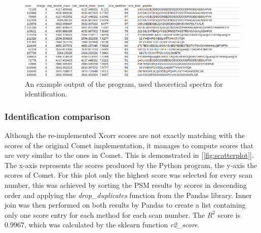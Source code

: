 \documentclass[11pt]{article}
\begin{document}
\begin{figure}[ht]
\centering
\includegraphics[width=1\textwidth]{figs/output.png}
\caption{An example output of the program, used theoretical spectra for identification.}
\label{fig:output}
\end{figure}

\subsubsection{Identification comparison}
Although the re-implemented Xcorr scores are not exactly matching with the scores of the original Comet implementation, it manages to compute scores that are very similar to the ones in Comet. This is demonstrated in [\cref{fig:scatterplot}]. The x-axis represents the scores produced by the Python program, the y-axis the scores of Comet. For this plot only the highest score was selected for every scan number, this was achieved by sorting the PSM results by scores in descending order and applying the \textit{drop\_duplicates} function from the Pandas library. Inner join was then performed on both results by Pandas to create a list containing only one score entry for each method for each scan number. The \(R^2\) score is 0.9967, which was calculated by the sklearn function \textit{r2\_score}.
\end{document}
